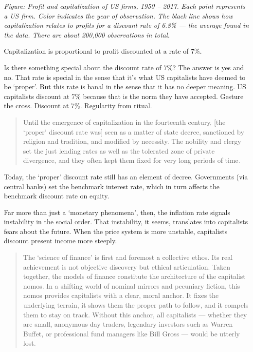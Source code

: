 \documentclass[
]{book}
\begin{document}
\emph{Figure: Profit and capitalization of US firms, 1950 -- 2017. Each point represents a US firm. Color indicates the year of observation. The black line shows how capitalization relates to profits for a discount rate of 6.8\% --- the average found in the data. There are about 200,000 observations in total.}

Capitalization is proportional to profit discounted at a rate of 7\%.

Is there something special about the discount rate of 7\%? The answer is yes and no. That rate is special in the sense that it's what US capitalists have deemed to be `proper'. But this rate is banal in the sense that it has no deeper meaning. US capitalists discount at 7\% because that is the norm they have accepted. Gesture the cross. Discount at 7\%. Regularity from ritual.

\begin{quote}
Until the emergence of capitalization in the fourteenth century, {[}the `proper' discount rate was{]} seen as a matter of state decree, sanctioned by religion and tradition, and modified by necessity. The nobility and clergy set the just lending rates as well as the tolerated zone of private divergence, and they often kept them fixed for very long periods of time.
\end{quote}

Today, the `proper' discount rate still has an element of decree. Governments (via central banks) set the benchmark interest rate, which in turn affects the benchmark discount rate on equity.

Far more than just a `monetary phenomena', then, the inflation rate signals instability in the social order. That instability, it seems, translates into capitalists fears about the future. When the price system is more unstable, capitalists discount present income more steeply.

\begin{quote}
The `science of finance' is first and foremost a collective ethos. Its real achievement is not objective discovery but ethical articulation. Taken together, the models of finance constitute the architecture of the capitalist nomos. In a shifting world of nominal mirrors and pecuniary fiction, this nomos provides capitalists with a clear, moral anchor. It fixes the underlying terrain, it shows them the proper path to follow, and it compels them to stay on track. Without this anchor, all capitalists --- whether they are small, anonymous day traders, legendary investors such as Warren Buffet, or professional fund managers like Bill Gross --- would be utterly lost.
\end{quote}
\end{document}
